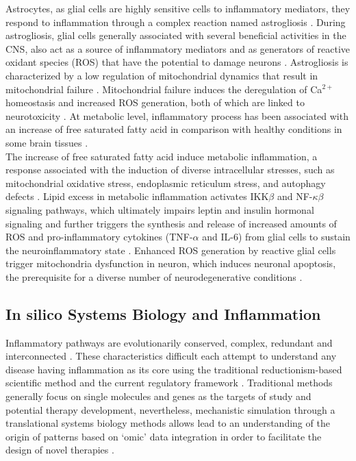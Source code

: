 Astrocytes, as glial cells are highly sensitive cells to inflammatory mediators, they respond to inflammation through a complex reaction named astrogliosis \cite{Dowell2009a}. During astrogliosis, glial cells generally associated with several beneficial activities in the CNS, also act as a source of inflammatory mediators and as generators of reactive oxidant species (ROS) that have the potential to damage neurons \cite{Molofsk2012}. Astrogliosis is characterized by a low regulation of mitochondrial dynamics that result in mitochondrial failure \cite{Sidoryk-Wegrzynowicz2013}. Mitochondrial failure induces the deregulation of Ca$^{2+}$ homeostasis and increased ROS generation, both of which are linked to neurotoxicity \cite{Lange2012}. At metabolic level, inflammatory process has been associated with an increase of free saturated fatty acid in comparison with healthy conditions in some brain tissues \cite{Gupta2012}. \\

The increase of free saturated fatty acid induce metabolic inflammation, a response associated with the induction of diverse intracellular stresses, such as mitochondrial oxidative stress, endoplasmic reticulum stress, and autophagy defects \cite{Jha2016}. Lipid excess in metabolic inflammation activates IKK$\beta$ and NF-$\kappa\beta$ signaling pathways, which ultimately impairs leptin and insulin hormonal signaling and further triggers the synthesis and release of increased amounts of ROS and pro-inflammatory cytokines (TNF-$\alpha$ and IL-6) from glial cells to sustain the neuroinflammatory state \cite{Purkayastha2015}. Enhanced ROS generation by reactive glial cells trigger mitochondria dysfunction in neuron, which induces neuronal apoptosis, the prerequisite for a diverse number of neurodegenerative conditions \cite{K.2006}.

\subsection*{In silico Systems Biology and  Inflammation}
Inflammatory pathways are evolutionarily conserved, complex, redundant and interconnected \cite{Vodovotz2010} . These characteristics difficult each attempt to understand any disease having inflammation as its core using the traditional reductionism-based scientific method and the current regulatory framework \cite{Vodovotz2008}. Traditional methods generally focus on single molecules and genes as the targets of study and potential therapy development, nevertheless, mechanistic simulation through a translational systems biology methods allows lead to an understanding of the origin of patterns based on `omic' data integration in order to facilitate the design of novel therapies  \cite{An2011}.\\

